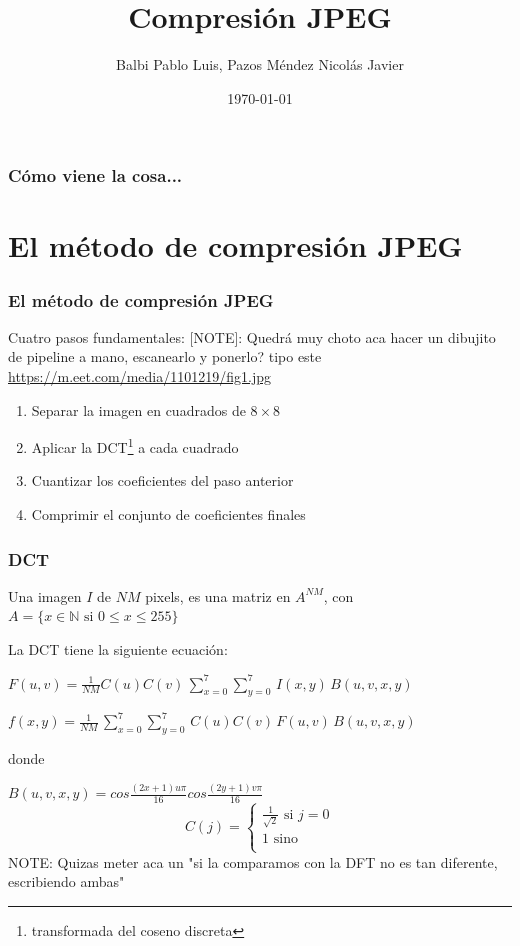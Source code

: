 \documentclass{beamer}
\begin{document}
\title{Compresión JPEG}
\author{Balbi Pablo Luis, Pazos Méndez Nicolás Javier}
\date{\today}

\begin{frame}
    \titlepage
\end{frame}

\begin{frame}
    \frametitle{Cómo viene la cosa...}
    \tableofcontents[hideallsubsections]
\end{frame}

\section{El método de compresión JPEG}
\begin{frame}
    \frametitle{El método de compresión JPEG}
        Cuatro pasos fundamentales:
        [NOTE]: Quedrá muy choto aca hacer un dibujito de pipeline a mano, escanearlo y ponerlo?
        tipo este \url{https://m.eet.com/media/1101219/fig1.jpg}
        \begin{enumerate}
            \item Separar la imagen en cuadrados de $8 \times 8$
            \item Aplicar la DCT\footnote{transformada del coseno discreta} a cada cuadrado
            \item Cuantizar los coeficientes del paso anterior
            \item Comprimir el conjunto de coeficientes finales
        \end{enumerate}

\end{frame}

\begin{frame}
    \frametitle{DCT}
    \begin{center}
        Una imagen $I$ de $NM$ pixels, es una matriz en $A^{NM}$, con $A = \{x \in \mathbb{N} \text{ si
        $0 \leq x \leq 255$}\}$ \vspace{6mm}

        La DCT tiene la siguiente ecuación:\vspace{6mm}

        $F(u,v)=\frac{1}{NM}C(u)C(v)\,\sum_{x=0}^{7} \sum_{y=0}^{7}\,I(x,y)\,B(u,v,x,y)$

        \vspace{3mm}
        $f(x,y)=\frac{1}{NM}\,\sum_{x=0}^{7} \sum_{y=0}^{7}\,C(u)C(v)\,F(u,v)\,B(u,v,x,y)$

        \vspace{3mm}
        donde
        \vspace{3mm}

        $B(u,v,x,y) = cos\frac{(2x+1)u\pi}{16}cos\frac{(2y+1)v\pi}{16}$
        \[
        C(j) =
             \begin{cases}
                 \frac{1}{\sqrt{2}}\text{ si $j=0$}\\
                 1 \text{ sino}\\
             \end{cases}
        \]
        NOTE: Quizas meter aca un "si la comparamos con la DFT no es tan diferente, escribiendo
        ambas"
    \end{center}
\end{frame}
\end{document}

